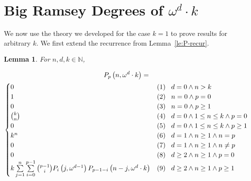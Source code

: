 \documentclass[10pt,a4paper]{article}
\newcommand{\om}{\omega}
\newcommand{\N}{\mathbb{N}}
\newcommand{\numpoints}{n}
\theoremstyle{plain}
\newtheorem{lemma}[theorem]{Lemma}
\theoremstyle{definition}
\begin{document}
\section{Big Ramsey Degrees of \texorpdfstring{$\om^d \cdot k$}{omega d * k}}\label{se:ord2} 

We now use the theory we developed for the case $k=1$ to prove results for arbitrary $k$. We first extend the recurrence from Lemma~\ref{le:P-recur}.

\begin{lemma}
\label{le:P-recur-k}
For $\numpoints,d,k \in \N$,

\begin{multline*}
    P_p\left( \numpoints,\om^d \cdot k\right) = \\
    \begin{cases}
    0 & \textnormal{(1)\phantom{0} } d = 0 \land \numpoints > k\\
    1 & \textnormal{(2)\phantom{0} } \numpoints = 0 \land p = 0\\
    0 & \textnormal{(3)\phantom{0} } \numpoints = 0 \land p \geq 1\\
    \binom{k}{\numpoints} & \textnormal{(4)\phantom{0} } d = 0 \land 1 \leq \numpoints \leq k \land p = 0\\
    0 & \textnormal{(5)\phantom{0} } d = 0 \land 1 \leq \numpoints \leq k \land p \geq 1\\
    k^\numpoints & \textnormal{(6)\phantom{0} } d = 1 \land \numpoints \geq 1 \land \numpoints = p\\
    0 & \textnormal{(7)\phantom{0} } d = 1 \land \numpoints \geq 1 \land \numpoints \neq p\\
    0 & \textnormal{(8)\phantom{0} } d \geq 2 \land \numpoints \geq 1 \land p = 0\\
    k \sum\limits_{j=1}^\numpoints
    \sum\limits_{i=0}^{p-1} \binom{p-1}{i} P_i \left( j,\om^{d-1} \right) P_{p-1-i} \left( \numpoints-j,\om^d \cdot k\right)
    & \textnormal{(9)\phantom{0} } d \geq 2 \land \numpoints \geq 1 \land p \geq 1
    \end{cases}
\end{multline*}


\end{lemma}
\end{document}

